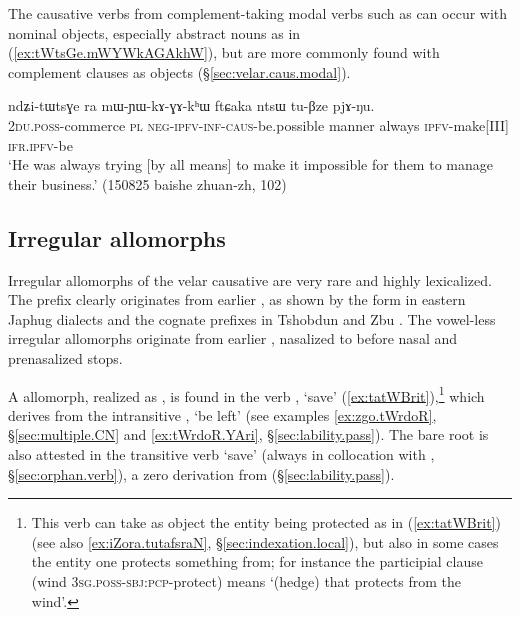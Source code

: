 
The causative verbs from complement-taking modal verbs such as  can occur with nominal objects, especially abstract nouns as in (\ref{ex:tWtsGe.mWYWkAGAkhW}), but are more commonly found with complement clauses as objects (§\ref{sec:velar.caus.modal}).

\begin{exe}
\ex \label{ex:tWtsGe.mWYWkAGAkhW}
 \gll ndʑi-tɯtsɣe ra mɯ-ɲɯ-kɤ-ɣɤ-kʰɯ ftɕaka ntsɯ tu-βze pjɤ-ŋu. \\
 \textsc{2du}.\textsc{poss}-commerce \textsc{pl} \textsc{neg}-\textsc{ipfv}-\textsc{inf}-\textsc{caus}-be.possible manner always \textsc{ipfv}-make[III] \textsc{ifr}.\textsc{ipfv}-be \\
 \glt `He was always trying [by all means] to make it impossible for them to manage their business.' (150825 baishe zhuan-zh, 102)
\end{exe} 

\subsection{Irregular allomorphs} \label{sec:causative.m}
Irregular allomorphs of the velar causative are very rare and highly lexicalized. The  prefix clearly originates from earlier , as shown by the form  in eastern Japhug dialects and the cognate prefixes  in Tshobdun and Zbu \citep{jackson14morpho}.  The vowel-less irregular allomorphs originate from earlier , nasalized to  before nasal and prenasalized stops. 

A  allomorph, realized as , is found in the verb , `save' (\ref{ex:tatWBrit}),\footnote{This verb can take as object the entity being protected as in (\ref{ex:tatWBrit}) (see also \ref{ex:iZora.tutafsraN}, §\ref{sec:indexation.local}), but also in some cases the entity one protects something from; for instance the participial clause  (wind \textsc{3sg}.\textsc{poss}-\textsc{sbj}:\textsc{pcp}-protect) means `(hedge) that protects from the wind'. } which derives from the intransitive , `be left' (see examples \ref{ex:zgo.tWrdoR}, §\ref{sec:multiple.CN} and \ref{ex:tWrdoR.YAri}, §\ref{sec:lability.pass}). The bare root  is also attested in the transitive verb  `save' (always in collocation with , §\ref{sec:orphan.verb}), a zero derivation from  (§\ref{sec:lability.pass}). 

